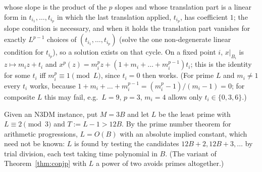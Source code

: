 \begin{thm}[first moment]
whose slope is the product of the $p$ slopes and whose translation part is a linear form in $t_{i_1},\dots,t_{i_p}$ in which the last
translation applied, $t_{i_p}$, has coefficient $1$; the slope condition is necessary, and when it holds the translation part vanishes for
exactly $L^{p-1}$ choices of $(t_{i_1},\dots,t_{i_p})$ (solve the one non-degenerate linear condition for $t_{i_p}$), so a solution exists
on that cycle. On a fixed point $i$, $x|_{B_i}$ is $z\mapsto m_iz+t_i$ and $x^{p}(z)=m_i^{p}z+(1+m_i+\dots+m_i^{p-1})t_i$; this is the
identity for some $t_i$ iff $m_i^{p}\equiv1\pmod L$, since $t_i=0$ then works. (For prime $L$ and $m_i\neq1$ every $t_i$ works, because
$1+m_i+\dots+m_i^{p-1}=(m_i^{p}-1)/(m_i-1)=0$; for composite $L$ this may fail, e.g.\ $L=9$, $p=3$, $m_i=4$ allows only $t_i\in\{0,3,6\}$.)

Given an N3DM instance, put $M=3B$ and let $L$ be the least prime with $L\equiv2\pmod3$ and $T:=L-1>12B$. By the prime number theorem
for arithmetic progressions, $L=O(B)$ with an absolute implied constant, which need not be known: $L$ is found by testing the candidates
$12B+2,12B+3,\dots$ by trial division, each test taking time polynomial in $B$. (The variant of Theorem~\ref{thm:conjp} with $L$ a power
of two avoids primes altogether.)


\end{thm}
